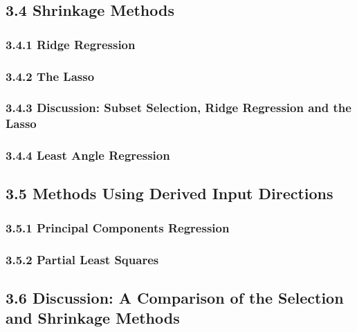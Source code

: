 \documentclass[11pt]{article}
\begin{document}
\subsection{3.4 Shrinkage Methods}\label{shrinkage-methods}

\subsubsection{3.4.1 Ridge Regression}\label{ridge-regression}

\subsubsection{3.4.2 The Lasso}\label{the-lasso}

\subsubsection{3.4.3 Discussion: Subset Selection, Ridge Regression and
the
Lasso}\label{discussion-subset-selection-ridge-regression-and-the-lasso}

\subsubsection{3.4.4 Least Angle
Regression}\label{least-angle-regression}

\subsection{3.5 Methods Using Derived Input
Directions}\label{methods-using-derived-input-directions}

\subsubsection{3.5.1 Principal Components
Regression}\label{principal-components-regression}

\subsubsection{3.5.2 Partial Least Squares}\label{partial-least-squares}

\subsection{3.6 Discussion: A Comparison of the Selection and Shrinkage
Methods}\label{discussion-a-comparison-of-the-selection-and-shrinkage-methods}
\end{document}
